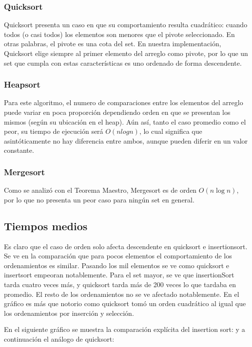 \documentclass[titlepage,a4paper]{article}
\begin{document}
\subsubsection{Quicksort}

Quicksort presenta un caso en que su comportamiento resulta cuadrático: cuando todos (o casi todos) los elementos son  menores que el pivote seleccionado. En otras palabras, el pivote es una cota del set. En nuestra implementación, Quicksort elige siempre al primer elemento del arreglo como pivote, por lo que un set que cumpla con estas características es uno ordenado de forma  descendente.

\subsubsection{Heapsort}

Para este algoritmo, el numero de comparaciones entre los elementos del arreglo puede variar en poca proporción dependiendo orden en que se presentan los mismos (según su ubicación en el heap). Aún así, tanto el caso promedio como el peor, su tiempo de ejecución será $O(n log n)$, lo cual significa que asintóticamente no hay diferencia entre ambos, aunque pueden diferir en un valor constante.

\subsubsection{Mergesort}

Como se analizó con el Teorema Maestro, Mergesort es de orden $O(n \log n)$, por lo que no presenta un peor caso para ningún set en general.


\subsection{Tiempos medios}

Es claro que el caso de orden solo afecta descendente en quicksort e insertionsort.
Se ve en la comparación que para pocos elementos el comportamiento de los ordenamientos es similar. Pasando los mil elementos se ve como quicksort e insertsort empeoran notablemente. Para el set mayor, se ve que insertionSort tarda cuatro veces más, y quicksort tarda más de 200 veces lo que tardaba en promedio. El resto de los ordenamientos no se ve afectado notablemente.
En el gráfico es más que notorio como quicksort tomó un orden cuadrático al igual que los ordenamientos por inserción y selección.

En el siguiente gráfico se muestra la comparación explícita del insertion sort:
y a continuación el análogo de quicksort:
\end{document}
